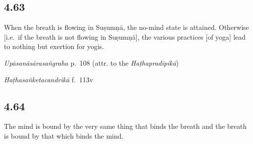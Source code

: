 \begin{ekdosis}

\subsection*{4.63}
\begin{translation}[hp04_063]
When the breath is flowing in Suṣumṇā, the no-mind state is attained. Otherwise [i.e.~if the breath is not flowing in Suṣumṇā], the various practices [of yoga] lead to nothing but exertion for yogis.
\end{translation}%


\begin{testimonia}[hp04_063]
\emph{Upāsanāsārasaṅgraha} p.~108 (attr. to the \emph{Haṭhapradīpikā})
\begin{versinnote}
\end{versinnote}

\emph{Haṭhasaṅketacandrikā} f.~113v
\begin{versinnote}
\end{versinnote}
\end{testimonia}


\subsection*{4.64}
\begin{translation}[hp04_064]
The mind is bound by the very same thing that binds the breath and the breath is bound by that which binds the mind.
\end{translation}



\end{ekdosis}
